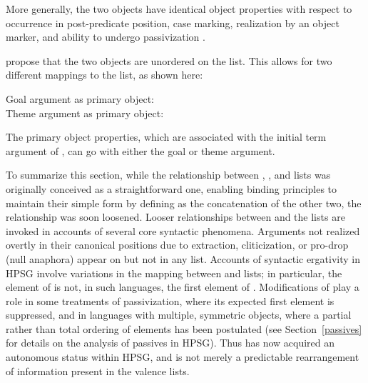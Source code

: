 \documentclass[output=paper
 	        ,biblatex
                ,babelshorthands
                ,newtxmath
                ,draftmode
                ,colorlinks, citecolor=brown
]{langscibook}
\begin{document}
\noindent
More generally, the two objects have identical object properties with respect to occurrence in
post-predicate position, case marking, realization by an object marker, and ability to undergo
passivization \citep[9]{Ackermanetal2017}.

\citet{Ackermanetal2017} propose that the two objects are unordered on the \argst list.  This allows
for two different mappings to the \comps list, as shown here:

\begin{exe} 
\ex		\label{moro-avm1}
\begin{xlist}
\ex Goal argument as primary object: \\
\ex Theme argument as primary object: \\
\end{xlist}
\end{exe}

\noindent
The primary object properties, which are associated with the initial term argument of \comps, can go
with either the goal or theme argument.

To summarize this section, while the relationship between \argst, \subj, and \comps lists was
originally conceived as a straightforward one, enabling binding principles to maintain their simple
form by defining \argst as the concatenation of the other two, the relationship was soon loosened.
Looser relationships between \argst and the  lists are invoked in accounts of several core
syntactic phenomena.  Arguments not realized overtly in their canonical positions due to extraction,
cliticization, or pro-drop (null anaphora) appear on \argst but not
in any  list.  Accounts of syntactic ergativity in HPSG involve variations in the mapping
between \argst and  lists; in particular, the element of \subj is not, in such languages, the
first element of \argst.  Modifications of \argst play a role in some treatments of passivization,
where its expected first element is suppressed, and in languages with multiple, symmetric objects,
where a partial rather than total ordering of \argst elements has been postulated (see
Section~\ref{passives} for details on the analysis of passives in HPSG).  Thus \argst has now
acquired an autonomous %
status within HPSG, and is not merely a predictable rearrangement of information present in the
valence lists.   
\end{document}
